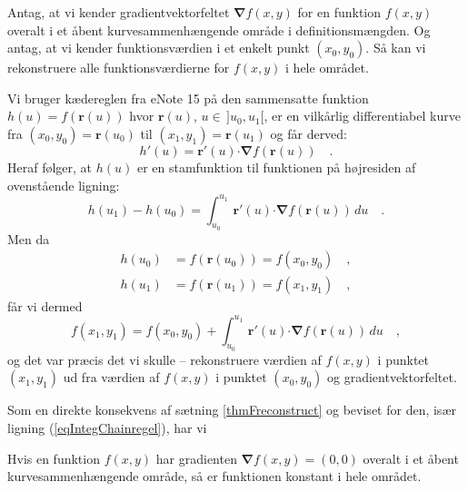 \begin{theorem} \label{thmFreconstruct}
Antag, at vi kender gradientvektorfeltet $\bm{\nabla}f(x,y)$ for en funktion $f(x,y)$ overalt i et åbent kurvesammenhængende område i definitionsmængden.
Og antag, at vi kender funktionsværdien i et enkelt punkt $(x_{0}, y_{0})$. Så kan vi rekonstruere alle funktionsværdierne for $f(x,y)$ i hele området.
\end{theorem}
\begin{bevis}
Vi bruger kædereglen fra eNote 15 på den sammensatte funktion $h(u) = f(\mathbf{r}(u))$ hvor $\mathbf{r}(u)$, $u \in \, ]u_{0}, u_{1}[$,  er en vilkårlig differentiabel kurve fra $(x_{0}, y_{0}) = \mathbf{r}(u_{0})$ til $(x_{1}, y_{1}) = \mathbf{r}(u_{1})$ og får derved:
\begin{equation}
h'(u) = \mathbf{r}'(u) \bm{\cdot} {\bm{\nabla}}f(\mathbf{r}(u)) \quad .
\end{equation}
Heraf følger, at $h(u)$  er en stamfunktion til funktionen på højresiden af ovenstående ligning:
\begin{equation} \label{eqIntegChainregelA}
h(u_{1}) - h(u_{0}) = \int_{u_{0}}^{u_{1}} \, \mathbf{r}'(u) \bm{\cdot} {\bm{\nabla}}f(\mathbf{r}(u))\, du  \quad .
\end{equation}
Men da
\begin{equation}
\begin{aligned}
h(u_{0}) &= f(\mathbf{r}(u_{0})) = f(x_{0}, y_{0}) \quad , \\
h(u_{1}) &= f(\mathbf{r}(u_{1})) = f(x_{1}, y_{1}) \quad ,
\end{aligned}
\end{equation}
får vi dermed
\begin{equation} \label{eqIntegChainregel}
 f(x_{1}, y_{1}) = f(x_{0}, y_{0}) + \int_{u_{0}}^{u_{1}} \,  \mathbf{r}'(u) \bm{\cdot} {\bm{\nabla}}f(\mathbf{r}(u)) \, du  \quad ,
\end{equation}
og det var præcis det vi skulle -- rekonstruere værdien af $f(x,y)$ i punktet $(x_{1}, y_{1})$ ud fra værdien af $f(x,y)$ i punktet $(x_{0}, y_{0})$ og gradientvektorfeltet.
\end{bevis}

Som en  direkte konsekvens af sætning \ref{thmFreconstruct} og beviset for den, især ligning (\ref{eqIntegChainregel}),  har vi


\begin{theorem} \label{thmNulGradient}
Hvis en funktion $f(x,y)$ har gradienten $\bm{\nabla}f(x,y) =(0, 0)$ overalt i et åbent kurvesammenhængende område, så er funktionen konstant
i hele området.
\end{theorem}

